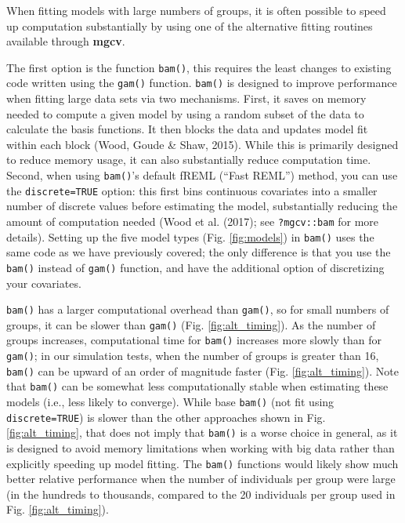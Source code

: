 \documentclass[12pt]{article}
\begin{document}
When fitting models with large numbers of groups, it is often possible
to speed up computation substantially by using one of the alternative
fitting routines available through \textbf{mgcv}.

The first option is the function \texttt{bam()}, this requires the least
changes to existing code written using the \texttt{gam()} function.
\texttt{bam()} is designed to improve performance when fitting large
data sets via two mechanisms. First, it saves on memory needed to
compute a given model by using a random subset of the data to calculate
the basis functions. It then blocks the data and updates model fit
within each block (Wood, Goude \& Shaw, 2015). While this is primarily
designed to reduce memory usage, it can also substantially reduce
computation time. Second, when using \texttt{bam()}'s default fREML
(``Fast REML'') method, you can use the \texttt{discrete=TRUE} option:
this first bins continuous covariates into a smaller number of discrete
values before estimating the model, substantially reducing the amount of
computation needed (Wood et al. (2017); see \texttt{?mgcv::bam} for more
details). Setting up the five model types (Fig. \ref{fig:models}) in
\texttt{bam()} uses the same code as we have previously covered; the
only difference is that you use the \texttt{bam()} instead of
\texttt{gam()} function, and have the additional option of discretizing
your covariates.

\texttt{bam()} has a larger computational overhead than \texttt{gam()},
so for small numbers of groups, it can be slower than \texttt{gam()}
(Fig. \ref{fig:alt_timing}). As the number of groups increases,
computational time for \texttt{bam()} increases more slowly than for
\texttt{gam()}; in our simulation tests, when the number of groups is
greater than 16, \texttt{bam()} can be upward of an order of magnitude
faster (Fig. \ref{fig:alt_timing}). Note that \texttt{bam()} can be
somewhat less computationally stable when estimating these models (i.e.,
less likely to converge). While base \texttt{bam()} (not fit using
\texttt{discrete=TRUE}) is slower than the other approaches shown in
Fig. \ref{fig:alt_timing}, that does not imply that \texttt{bam()} is a
worse choice in general, as it is designed to avoid memory limitations
when working with big data rather than explicitly speeding up model
fitting. The \texttt{bam()} functions would likely show much better
relative performance when the number of individuals per group were large
(in the hundreds to thousands, compared to the 20 individuals per group
used in Fig. \ref{fig:alt_timing}).
\end{document}
